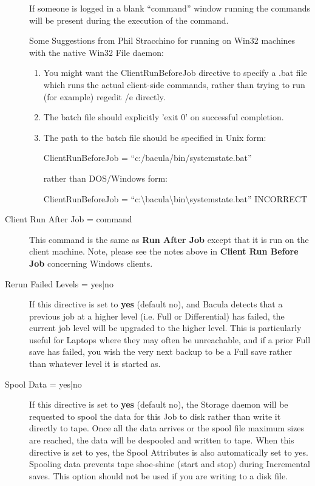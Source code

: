\begin{description}
   If someone is logged in a blank ``command'' window running the  commands will
   be present during the execution of the command.  
   
   Some Suggestions from Phil Stracchino for running on Win32 machines  with the
   native Win32 File daemon: 

   \begin{enumerate}
   \item You might want the ClientRunBeforeJob directive to specify a .bat file
      which  runs the actual client-side commands, rather than trying to run (for 
      example) regedit /e directly.  
   \item The batch file should explicitly 'exit 0' on successful completion.  
   \item The path to the batch file should be specified in Unix form:  
   
      ClientRunBeforeJob = ``c:/bacula/bin/systemstate.bat''  
   
   rather than DOS/Windows form:  
   
   ClientRunBeforeJob =
   ``c:\textbackslash{}bacula\textbackslash{}bin\textbackslash{}systemstate.bat''
   INCORRECT 
   \end{enumerate}

\item [Client Run After Job = \lt{}command\gt{}]
   This command  is the same as {\bf Run After Job} except that it is  run on the
   client machine. Note, please see the notes above  in {\bf Client Run Before
   Job} concerning Windows clients. 

\item [Rerun Failed Levels = \lt{}yes|no\gt{}]
   If this directive  is set to {\bf yes} (default no), and Bacula detects that a
   previous job at a higher level (i.e. Full or Differential)  has failed, the
   current job level will be upgraded to the  higher level. This is particularly
   useful for Laptops where  they may often be unreachable, and if a prior Full
   save has  failed, you wish the very next backup to be a Full save  rather than
   whatever level it is started as. 

\item [Spool Data = \lt{}yes|no\gt{}]
   If this directive is set  to {\bf yes} (default no), the Storage daemon will
be requested  to spool the data for this Job to disk rather than write it 
directly to tape. Once all the data arrives or the spool file  maximum sizes
are reached, the data will be despooled and written  to tape. When this
directive is set to yes, the Spool Attributes  is also automatically set to
yes. Spooling data prevents tape  shoe-shine (start and stop) during
Incremental saves. This option  should not be used if you are writing to a
disk file. 


\end{description}
